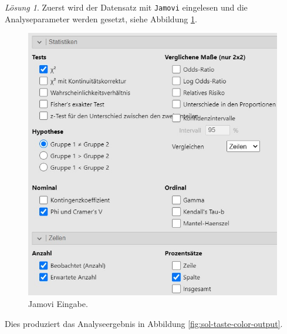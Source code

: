\documentclass[
]{book}
\theoremstyle{definition}
\theoremstyle{definition}
\theoremstyle{definition}
\theoremstyle{definition}
\theoremstyle{remark}
\newtheorem*{solution}{Lösung}
\begin{document}
\begin{solution}

Zuerst wird der Datensatz mit \texttt{Jamovi} eingelesen und die
Analyseparameter werden gesetzt, siehe Abbildung
\ref{fig:sol-taste-color-input}.

\begin{figure}

{\centering \includegraphics{figures/10-exr-taste-color-jmv-input} 

}

\caption{Jamovi Eingabe.}\label{fig:sol-taste-color-input}
\end{figure}

Dies produziert das Analyseergebnis in Abbildung
\ref{fig:sol-taste-color-output}.

\begin{figure}


\end{figure}
\end{solution}
\end{document}
